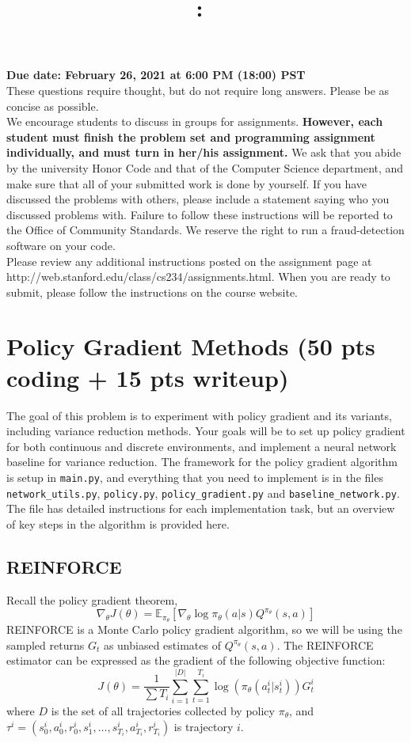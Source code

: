 \documentclass{article}
\title{
\vspace{-1in}
\textmd{\textbf{\hmwkClass:\ \hmwkTitle}}}
\author{}
\date{} %
\begin{document}
\maketitle
\vspace{-.5in}
\begin{framed}
{\bf Due date: February 26, 2021 at 6:00 PM (18:00) PST}
\\[1em]
These questions require thought, but do not require long answers. Please be as concise as possible.
\\[1em]
We encourage students to discuss in groups for assignments. \textbf{However, each student must finish the
problem set and programming assignment individually, and must turn in her/his assignment.} We ask
that you abide by the university Honor Code and that of the Computer Science department, and make
sure that all of your submitted work is done by yourself. If you have discussed the problems with others,
please include a statement saying who you discussed problems with. Failure to follow these instructions
will be reported to the Office of Community Standards. We reserve the right to run a fraud-detection software on your code.
\\[1em]
Please review any additional instructions posted on the assignment page at
http://web.stanford.edu/class/cs234/assignments.html. When you are ready to submit, please
follow the instructions on the course website.
\\[1em]
\end{framed}

\section{Policy Gradient Methods (50 pts coding + 15 pts writeup)}
The goal of this problem is to experiment with policy gradient and its variants, including variance reduction methods. Your goals will be to set up policy gradient for both continuous and discrete environments, and implement a neural network baseline for variance reduction. The framework for the policy gradient algorithm is setup in \texttt{main.py}, and everything that you need to implement is in the files \texttt{network\_utils.py}, \texttt{policy.py}, \texttt{policy\_gradient.py} and \texttt{baseline\_network.py}. The file has detailed instructions for each implementation task, but an overview of key steps in the algorithm is provided here.
\subsection{REINFORCE}
Recall the policy gradient theorem,
\[ \nabla_\theta J(\theta) = \mathbb E_{\pi_\theta} \left[ \nabla_\theta \log\pi_\theta(a|s) Q^{\pi_\theta} (s,a) \right] \]
REINFORCE is a Monte Carlo policy gradient algorithm, so we will be using the sampled returns $G_t$ as unbiased estimates of $Q^{\pi_\theta}(s,a)$. 
The REINFORCE estimator can be expressed as the gradient of the following objective function:
\[ J(\theta) = \frac{1}{\sum T_i} \sum_{i=1}^{|D|} \sum_{t=1}^{T_i} \log(\pi_\theta(a^i_t|s^i_t)) G^i_t \]
where $D$ is the set of all trajectories collected by policy $\pi_\theta$, and $\tau^i =(s^i_0, a^i_0, r^i_0, s^i_1, \dots, s^i_{T_i}, a^i_{T_i}, r^i_{T_i})$ is trajectory $i$.
\end{document}
